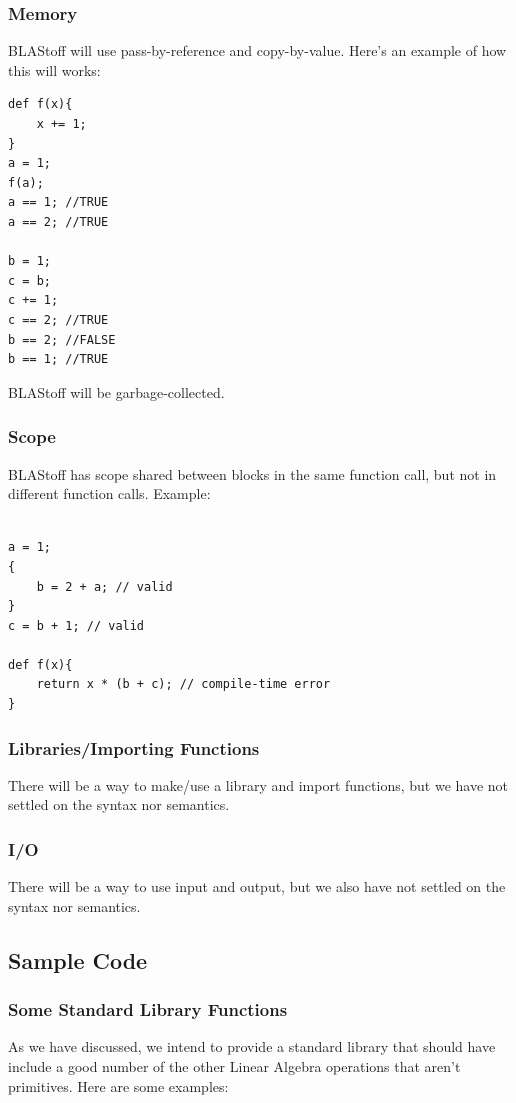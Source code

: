 \subsubsection{Memory}
BLAStoff will use pass-by-reference and copy-by-value.  Here's an example of how this will works:
\begin{lstlisting}
def f(x){
    x += 1;
}
a = 1;
f(a);
a == 1; //TRUE
a == 2; //TRUE

b = 1;
c = b;
c += 1;
c == 2; //TRUE
b == 2; //FALSE
b == 1; //TRUE
\end{lstlisting}

BLAStoff will be garbage-collected.

\subsubsection{Scope}
BLAStoff has scope shared between blocks in the same function call, but not in different function calls.   Example:
\begin{lstlisting}

a = 1;
{
    b = 2 + a; // valid
}
c = b + 1; // valid

def f(x){
    return x * (b + c); // compile-time error
}
\end{lstlisting}


\subsubsection{Libraries/Importing Functions}
There will be a way to make/use a library and import functions, but we have not settled on the syntax nor semantics.
\subsubsection{I/O}
There will be a way to use input and output, but we also have not settled on the syntax nor semantics.



\subsection{Sample Code}

\subsubsection{Some Standard Library Functions}
As we have discussed, we intend to provide a standard library that should have include a good number of the other Linear Algebra operations that aren't primitives.  Here are some examples:

